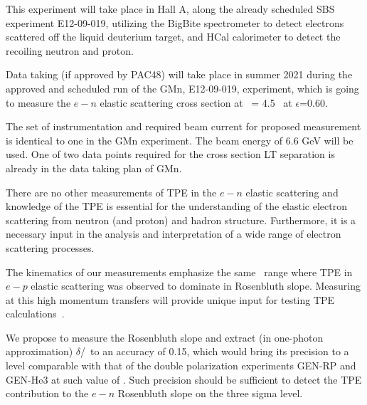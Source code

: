 This experiment will take place in Hall A, along the already scheduled SBS \gmn experiment E12-09-019, utilizing the BigBite spectrometer to detect electrons scattered off 
the liquid deuterium target, and HCal calorimeter to detect the recoiling neutron and proton.

Data taking (if approved by PAC48) will take place in summer 2021 during the approved and scheduled run of the GMn, E12-09-019, experiment,
which is going to measure the $e-n$ elastic scattering cross section at \qsq~= 4.5 \gevcsq~at $\epsilon$=0.60.

The set of instrumentation and required beam current for proposed measurement is identical to one in the GMn experiment.
The beam energy of 6.6 GeV will be used.
One of two data points required for the cross section LT separation is already in the data taking plan of GMn.

There are no other measurements of TPE in the $e-n$ elastic scattering and knowledge of the TPE is essential for the understanding 
of the elastic electron scattering from neutron (and proton) and hadron structure.  
Furthermore, it is a necessary input in the analysis and interpretation of a wide range of electron scattering processes. 

The kinematics of our measurements emphasize the same \qsq~range where TPE in $e-p$ elastic scattering was observed to dominate in Rosenbluth slope.
Measuring at this high momentum transfers will provide unique input for testing TPE calculations~\cite{Blunden:2005ew}.

We propose to measure the Rosenbluth slope and extract (in one-photon approximation) $\delta$\gen/\gmn~to an accuracy of 0.15, which would bring its precision to a level comparable with that of the double polarization experiments GEN-RP and GEN-He3 at such value of \qsq.
Such precision should be sufficient to detect the TPE contribution to the $e-n$ Rosenbluth slope on the three sigma level.
